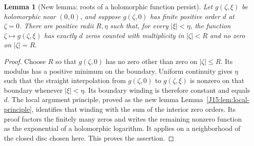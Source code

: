 \documentclass[11pt,oneside]{report}
\newtheorem{lemma}[theorem]{Lemma}
\theoremstyle{definition}
\numberwithin{equation}{section}
\begin{document}
\begin{lemma}[New lemma: roots of a holomorphic function persist]
\label{J14:lem:persistence}
Let $g(\zeta,\xi)$ be holomorphic near $(0,0)$, and suppose
$g(\zeta,0)$ has finite positive order $d$ at $\zeta=0$.
There are positive radii $R,\eta$ such that, for every $|\xi|<\eta$,
the function $\zeta\mapsto g(\zeta,\xi)$ has exactly $d$ zeros counted with
multiplicity in $|\zeta|<R$ and no zero on $|\zeta|=R$.
\end{lemma}
\begin{proof}
Choose $R$ so that $g(\zeta,0)$ has no zero other than zero on
$|\zeta|\leq R$. Its modulus has a positive minimum on the boundary.
Uniform continuity gives $\eta$ such that the straight interpolation from
$g(\zeta,0)$ to $g(\zeta,\xi)$ is nonzero on that boundary whenever
$|\xi|<\eta$. Its boundary winding is therefore constant and equals $d$.
The local argument principle, proved as the new lemma
Lemma~\ref{J15:lem:local-principle}, identifies that
winding with the sum of the interior zero orders. Its proof factors the
finitely many zeros and writes the remaining nonzero function as the
exponential of a holomorphic logarithm. It applies on a neighborhood of the
closed disc chosen here. This proves the assertion.
\end{proof}
\end{document}
